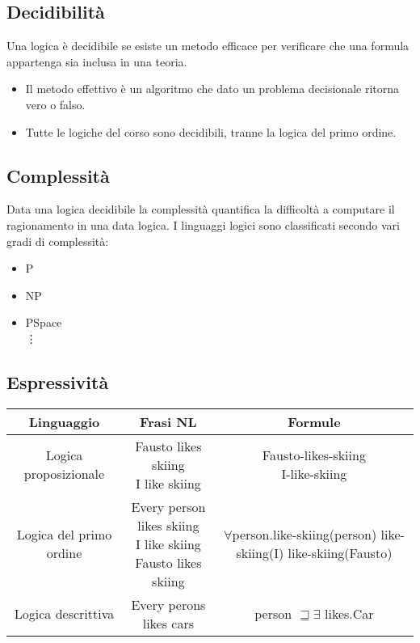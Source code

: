 \documentclass[../main.tex]{subfiles}
\begin{document}
    \subsection{Decidibilità}
    Una logica è decidibile se esiste un metodo efficace per verificare che una formula appartenga sia inclusa in una teoria.
    \begin{itemize}
        \item Il metodo effettivo è un algoritmo che dato un problema decisionale ritorna vero o falso.
        \item Tutte le logiche del corso sono decidibili, tranne la logica del primo ordine.
    \end{itemize}

    \subsection{Complessità}
    Data una logica decidibile la complessità quantifica la difficoltà a computare il ragionamento in una data logica.
    I linguaggi logici sono classificati secondo vari gradi di complessità:
    \begin{itemize}
        \item P
        \item NP
        \item PSpace\\
        \vdots
    \end{itemize}

    \subsection{Espressività}
    \begin{center}
        \begin{tabular}{|c|c|c|}
            \hline
            Linguaggio & Frasi NL & Formule\\
            \hline
            Logica proposizionale & \makecell{Fausto likes skiing\\ I like skiing} & \makecell{Fausto-likes-skiing\\ I-like-skiing}\\
            \hline
            Logica del primo ordine & \makecell{Every person likes skiing\\ I like skiing\\ Fausto likes skiing} & \makecell{$\forall$person.like-skiing(person)\\ like-skiing(I)\\ like-skiing(Fausto)}\\
            \hline
            Logica descrittiva & Every perons likes cars & person $\sqsupseteq \exists$ likes.Car\\
            \hline
        \end{tabular}
    \end{center}
\end{document}
